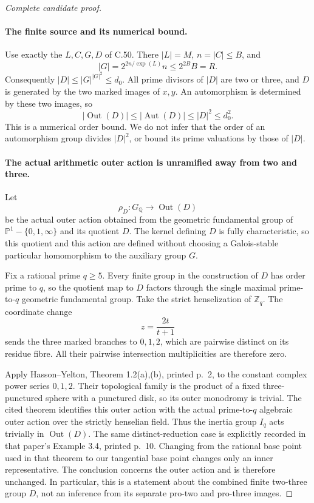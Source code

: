 \begin{proof}[Complete candidate proof]
\paragraph{The finite source and its numerical bound.}
Use exactly the $L,C,G,D$ of C.50. There $|L|=M$,
$n=|C|\le B$, and
\[
 |G|=2^{2n/\exp(L)}n\le 2^{2B}B=R.
                                                        \tag{C.51.5}
\]
Consequently $|D|\le |G|^{|G|^2}\le d_0$. All prime divisors
of $|D|$ are two or three, and $D$ is generated by the two
marked images of $x,y$. An automorphism is determined by these
two images, so
\[
 |\operatorname{Out}(D)|
       \le|\operatorname{Aut}(D)|\le |D|^2\le d_0^2.
                                                        \tag{C.51.6}
\]
This is a numerical order bound. We do not infer that the order of
an automorphism group divides $|D|^2$, or bound its prime valuations
by those of $|D|$.

\paragraph{The actual arithmetic outer action is unramified away from two and three.}
Let
\[
 \rho_D:G_{\mathbb Q}\longrightarrow\operatorname{Out}(D)
                                                        \tag{C.51.7}
\]
be the actual outer action obtained from the geometric fundamental
group of $\mathbb P^1-\{0,1,\infty\}$ and its quotient $D$.
The kernel defining $D$ is fully characteristic, so this quotient
and this action are defined without choosing a Galois-stable
particular homomorphism to the auxiliary group $G$.

Fix a rational prime $q\ge5$. Every finite group in the construction
of $D$ has order prime to $q$, so the quotient map to $D$ factors
through the single maximal prime-to-$q$ geometric fundamental
group. Take the strict henselization of $\mathbb Z_q$. The coordinate
change
\[
                         z=\frac{2t}{t+1}
                                                        \tag{C.51.8}
\]
sends the three marked branches to $0,1,2$, which are pairwise
distinct on its residue fibre. All their pairwise intersection
multiplicities are therefore zero.

Apply Hasson--Yelton, Theorem 1.2(a),(b), printed p.~2,
to the constant complex power series $0,1,2$.
Their topological family is the product of a fixed three-punctured
sphere with a punctured disk, so its outer monodromy is trivial.
The cited theorem identifies this outer action with the actual
prime-to-$q$ algebraic outer action over the strictly henselian
field. Thus the inertia group $I_q$ acts trivially in
$\operatorname{Out}(D)$.
The same distinct-reduction case is explicitly recorded in that
paper's Example 3.4, printed p.~10.
\cite[Theorem~1.2 and Example~3.4]{PBC_HassonYelton2020}
Changing from the rational base point used in that theorem to our
tangential base point changes only an inner representative.
The conclusion concerns the outer action and is therefore unchanged.
In particular, this is a statement about the combined finite
two-three group $D$, not an inference from its separate pro-two
and pro-three images.


\end{proof}
